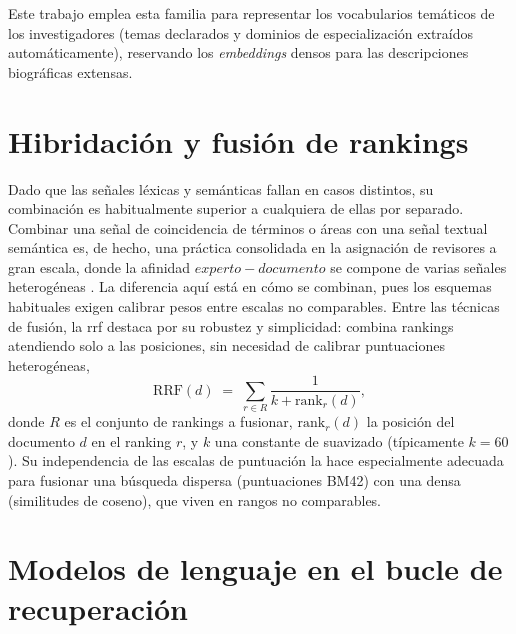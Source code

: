 Este trabajo emplea esta familia para representar los vocabularios temáticos de los investigadores (temas declarados y dominios de especialización extraídos automáticamente), reservando los \emph{embeddings} densos para las descripciones biográficas extensas.

\section{Hibridación y fusión de rankings}
\label{sec:sota-fusion}

Dado que las señales léxicas y semánticas fallan en casos distintos, su combinación es habitualmente superior a cualquiera de ellas por separado.
Combinar una señal de coincidencia de términos o áreas con una señal textual semántica es, de hecho, una práctica consolidada en la asignación de revisores a gran escala, donde la afinidad $experto-documento$ se compone de varias señales heterogéneas \citep{charlin2013tpms}.
La diferencia aquí está en cómo se combinan, pues los esquemas habituales exigen calibrar pesos entre escalas no comparables.
Entre las técnicas de fusión, la \gls{rrf} \citep{cormack2009rrf} destaca por su robustez y simplicidad: combina rankings atendiendo solo a las posiciones, sin necesidad de calibrar puntuaciones heterogéneas,
\begin{equation}
\mathrm{RRF}(d) \;=\; \sum_{r \in R} \frac{1}{k + \mathrm{rank}_r(d)},
\label{eq:rrf}
\end{equation}
donde $R$ es el conjunto de rankings a fusionar, $\mathrm{rank}_r(d)$ la posición del documento $d$ en el ranking $r$, y $k$ una constante de suavizado (típicamente $k=60$).
Su independencia de las escalas de puntuación la hace especialmente adecuada para fusionar una búsqueda dispersa (puntuaciones BM42) con una densa (similitudes de coseno), que viven en rangos no comparables.

\section{Modelos de lenguaje en el bucle de recuperación}
\label{sec:sota-llm}


